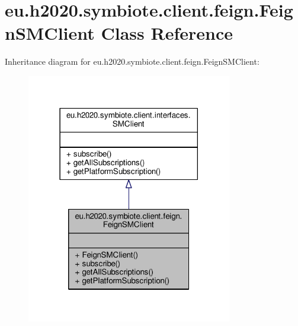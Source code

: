 \hypertarget{classeu_1_1h2020_1_1symbiote_1_1client_1_1feign_1_1FeignSMClient}{}\section{eu.\+h2020.\+symbiote.\+client.\+feign.\+Feign\+S\+M\+Client Class Reference}
\label{classeu_1_1h2020_1_1symbiote_1_1client_1_1feign_1_1FeignSMClient}


Inheritance diagram for eu.\+h2020.\+symbiote.\+client.\+feign.\+Feign\+S\+M\+Client\+:\nopagebreak
\begin{figure}[H]
\begin{center}
\leavevmode
\includegraphics[width=254pt]{classeu_1_1h2020_1_1symbiote_1_1client_1_1feign_1_1FeignSMClient__inherit__graph}
\end{center}
\end{figure}



